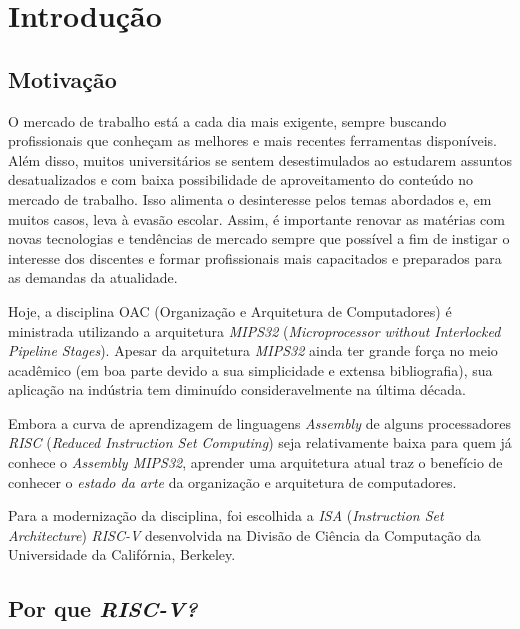 \chapter{Introdução}

\label{CapIntro}



\section{Motivação}

    {O mercado de trabalho está a cada dia mais exigente, sempre buscando profissionais que conheçam as melhores e mais recentes ferramentas disponíveis. Além disso, muitos universitários se sentem desestimulados ao estudarem assuntos desatualizados e com baixa possibilidade de aproveitamento do conteúdo no mercado de trabalho. Isso alimenta o desinteresse pelos temas abordados e, em muitos casos, leva à evasão escolar. Assim, é importante renovar as matérias com novas tecnologias e tendências de mercado sempre que possível a fim de instigar o interesse dos discentes e formar profissionais mais capacitados e preparados para as demandas da atualidade.}

    {Hoje, a disciplina OAC (Organização e Arquitetura de Computadores) é ministrada utilizando a arquitetura \textit{MIPS32} (\textit{Microprocessor without Interlocked Pipeline Stages}). Apesar da arquitetura \textit{MIPS32} ainda ter grande força no meio acadêmico (em boa parte devido a sua simplicidade e extensa bibliografia), sua aplicação na indústria tem diminuído consideravelmente na última década.}

    {Embora a curva de aprendizagem de linguagens \textit{Assembly} de alguns processadores \textit{RISC} (\textit{Reduced Instruction Set Computing}) seja relativamente baixa para quem já conhece o \textit{Assembly MIPS32}, aprender uma arquitetura atual traz o benefício de conhecer o \textit{estado da arte} da organização e arquitetura de computadores.}

    {Para a modernização da disciplina, foi escolhida a \textit{ISA} (\textit{Instruction Set Architecture}) \textit{RISC-V} desenvolvida na Divisão de Ciência da Computação da Universidade da Califórnia, Berkeley.}

\section{Por que \textit{RISC-V?}}

